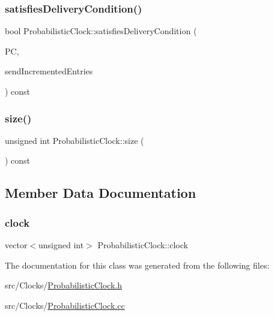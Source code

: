 \mbox{\label{classProbabilisticClock_a56bced001a856aa04168d787cc2dd549}} 
\subsubsection{\texorpdfstring{satisfies\+Delivery\+Condition()}{satisfiesDeliveryCondition()}}
{\footnotesize\ttfamily bool Probabilistic\+Clock\+::satisfies\+Delivery\+Condition (\begin{DoxyParamCaption}\item[{const \hyperlink{classProbabilisticClock}{Probabilistic\+Clock} \&}]{PC,  }\item[{const vector$<$ unsigned int $>$ \&}]{send\+Incremented\+Entries }\end{DoxyParamCaption}) const}

\mbox{\label{classProbabilisticClock_ad0cdbd2ad50309fae0665df4ee5247ba}} 
\subsubsection{\texorpdfstring{size()}{size()}}
{\footnotesize\ttfamily unsigned int Probabilistic\+Clock\+::size (\begin{DoxyParamCaption}{ }\end{DoxyParamCaption}) const}



\subsection{Member Data Documentation}
\mbox{\label{classProbabilisticClock_a4839958d0e2368cec8bb159b69ac0e76}} 
\subsubsection{\texorpdfstring{clock}{clock}}
{\footnotesize\ttfamily vector$<$unsigned int$>$ Probabilistic\+Clock\+::clock\hspace{0.3cm}{\ttfamily [private]}}



The documentation for this class was generated from the following files\+:\begin{DoxyCompactItemize}
\item 
src/\+Clocks/\hyperlink{ProbabilisticClock_8h}{Probabilistic\+Clock.\+h}\item 
src/\+Clocks/\hyperlink{ProbabilisticClock_8cc}{Probabilistic\+Clock.\+cc}\end{DoxyCompactItemize}
